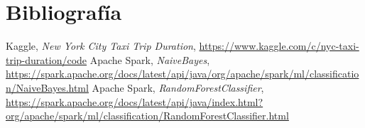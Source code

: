 \documentclass[12pt]{article}
\begin{document}
\section{Bibliografía}
\begin{thebibliography}{0}
      Kaggle,
      \emph{New York City Taxi Trip Duration},
      \url{https://www.kaggle.com/c/nyc-taxi-trip-duration/code}
      Apache Spark,
      \emph{NaiveBayes},
      \url{https://spark.apache.org/docs/latest/api/java/org/apache/spark/ml/classification/NaiveBayes.html}
      Apache Spark,
      \emph{RandomForestClassifier},
      \url{https://spark.apache.org/docs/latest/api/java/index.html?org/apache/spark/ml/classification/RandomForestClassifier.html}
\end{thebibliography}
\end{document}
